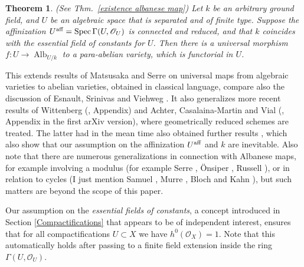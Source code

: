 \documentclass[oneside, 12pt]{amsart}
\newtheorem*{maintheorem}{Theorem}
\theoremstyle{definition}
\theoremstyle{remark}
\newcommand{\aff}{\text{\rm aff}}
\newcommand{\Alb}{\operatorname{Alb}}
\renewcommand{\O}{\mathscr{O}}
\newcommand{\ra}{\rightarrow}
\newcommand{\Spec}{\operatorname{Spec}}
\begin{document}
\begin{maintheorem}
(See Thm.\ \ref{existence albanese map})
Let $k$ be an arbitrary ground field, and $U$ be an algebraic space that is separated and of finite type.
Suppose the affinization   $U^\aff=\Spec\Gamma(U,\O_U)$ is connected and reduced, and   that $k$ coincides with the essential   field of constants for $U$.
Then there is a universal morphism $f:U\ra\Alb_{U/k}$ to a para-abelian variety, which is functorial in $U$.
\end{maintheorem}

This extends results of Matsusaka \cite{Matsusaka 1953} and Serre  \cite{Serre 1960}    on universal maps from algebraic varieties to abelian varieties, 
obtained  in   classical language, compare also the discussion of Esnault, Srinivas and Viehweg \cite{Esnault; Srinivas; Viehweg 1992}. It also generalizes more 
recent results of Wittenberg (\cite{Wittenberg 2008}, Appendix) and Achter, Casalaina-Martin and Vial (\cite{Achter; Casalaina-Martin; Vial 2019}, Appendix in the first arXiv version),
where geometrically reduced schemes are treated. The  latter had in the mean time also obtained further results  \cite{Achter; Casalaina-Martin; Vial 2022},  which also show that our assumption
on the affinization $U^\aff$ and $k$ are inevitable. Also note that there  are numerous generalizations in connection with Albanese maps,
for example involving a modulus (for example  Serre \cite{Serre 1975}, \"Onsiper \cite{Onsiper 1989}, Russell \cite{Russell 2013}), or in relation to  cycles 
(I just mention Samuel \cite{Samuel 1960}, Murre \cite{Murre 1985}, Bloch \cite{Bloch 1976} and Kahn \cite{Kahn 2021}), but such matters are beyond the scope of this paper.

Our assumption on the \emph{essential  fields of constants}, 
a     concept introduced in Section \ref{Compactifications} that appears to be of independent interest,
ensures that for all compactifications $U\subset X$ we have $h^0(\O_X)=1$.
Note that this automatically holds after passing to a finite field extension  inside   the ring $\Gamma(U,\O_U)$.
\end{document}
